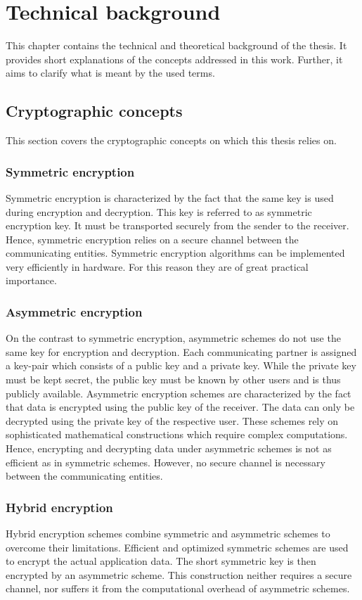 \documentclass[../main.tex]{subfiles}
\begin{document}
\chapter{Technical background}
This chapter contains the technical and theoretical background of the thesis.
It provides short explanations of the concepts addressed in this work.
Further, it aims to clarify what is meant by the used terms.


\section{Cryptographic concepts}
This section covers the cryptographic concepts on which this thesis relies on.

\subsection{Symmetric encryption}
Symmetric encryption is characterized by the fact that the same key is used during encryption and decryption.
This key is referred to as symmetric encryption key.
It must be transported securely from the sender to the receiver.
Hence, symmetric encryption relies on a secure channel between the communicating entities.
Symmetric encryption algorithms can be implemented very efficiently in hardware.
For this reason they are of great practical importance.~\cite[300]{Eckert2018}

\subsection{Asymmetric encryption}
On the contrast to symmetric encryption, asymmetric schemes do not use the same key for encryption and decryption.
Each communicating partner is assigned a key-pair which consists of a public key and a private key.
While the private key must be kept secret, the public key must be known by other users and is thus publicly available.
Asymmetric encryption schemes are characterized by the fact that data is encrypted using the public key of the receiver.
The data can only be decrypted using the private key of the respective user.
These schemes rely on sophisticated mathematical constructions which require complex computations.
Hence, encrypting and decrypting data under asymmetric schemes is not as efficient as in symmetric schemes.
However, no secure channel is necessary between the communicating entities.~\cite[331]{Eckert2018}


\subsection{Hybrid encryption}
\label{sec:hybrid}
Hybrid encryption schemes combine symmetric and asymmetric schemes to overcome their limitations.
Efficient and optimized symmetric schemes are used to encrypt the actual application data.
The short symmetric key is then encrypted by an asymmetric scheme.
This construction neither requires a secure channel, nor suffers it from the computational overhead of asymmetric schemes.~\cite{Wolf2007}
\end{document}
